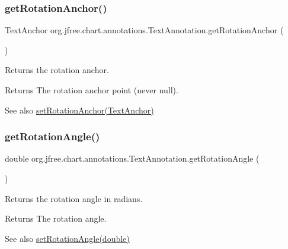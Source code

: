 \subsubsection{\texorpdfstring{get\+Rotation\+Anchor()}{getRotationAnchor()}}
{\footnotesize\ttfamily Text\+Anchor org.\+jfree.\+chart.\+annotations.\+Text\+Annotation.\+get\+Rotation\+Anchor (\begin{DoxyParamCaption}{ }\end{DoxyParamCaption})}

Returns the rotation anchor.

\begin{DoxyReturn}{Returns}
The rotation anchor point (never {\ttfamily null}).
\end{DoxyReturn}
\begin{DoxySeeAlso}{See also}
\mbox{\hyperlink{classorg_1_1jfree_1_1chart_1_1annotations_1_1_text_annotation_a1d43efc7fe9a628e089ded8bc447564b}{set\+Rotation\+Anchor(\+Text\+Anchor)}} 
\end{DoxySeeAlso}
\mbox{\label{classorg_1_1jfree_1_1chart_1_1annotations_1_1_text_annotation_ade23fab527551f75375563c2a138e3c0}} 
\subsubsection{\texorpdfstring{get\+Rotation\+Angle()}{getRotationAngle()}}
{\footnotesize\ttfamily double org.\+jfree.\+chart.\+annotations.\+Text\+Annotation.\+get\+Rotation\+Angle (\begin{DoxyParamCaption}{ }\end{DoxyParamCaption})}

Returns the rotation angle in radians.

\begin{DoxyReturn}{Returns}
The rotation angle.
\end{DoxyReturn}
\begin{DoxySeeAlso}{See also}
\mbox{\hyperlink{classorg_1_1jfree_1_1chart_1_1annotations_1_1_text_annotation_ac629e4dd9695447f5a41e87a65436af7}{set\+Rotation\+Angle(double)}} 
\end{DoxySeeAlso}
\mbox{\label{classorg_1_1jfree_1_1chart_1_1annotations_1_1_text_annotation_a74805ae428257122d1ebb45fd7f938cc}} 
